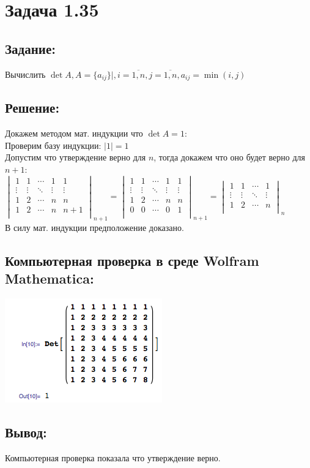 \section{Задача 1.35}
\subsection{Задание:}
Вычислить $ \det A, A = \{ a_{ij} \} |, i = \overline{1,n}, j = \overline{1,n}, a_{ij} = \min (i,j) $
\subsection{Решение:}
Докажем методом мат. индукции что $ \det A = 1 $:
\\
Проверим базу индукции: $ |1| = 1 $
\\
Допустим что утверждение верно для $ n $, тогда докажем что оно будет верно для $ n + 1 $:
\\[1em]
$
	\begin{vmatrix}
		     1 &      1 & \cdots &      1 &       1 \\
		\vdots & \vdots & \ddots & \vdots &  \vdots \\
		     1 &      2 & \cdots &      n &       n \\
		     1 &      2 & \cdots &      n &   n + 1 \\
	\end{vmatrix}_{n + 1}
	=
	\begin{vmatrix}
		     1 &      1 & \cdots &      1 &       1 \\
		\vdots & \vdots & \ddots & \vdots &  \vdots \\
		     1 &      2 & \cdots &      n &       n \\
		     0 &      0 & \cdots &      0 &       1 \\
	\end{vmatrix}_{n + 1}
	=
	\begin{vmatrix}
		     1 &      1 & \cdots &      1  \\
		\vdots & \vdots & \ddots & \vdots  \\
		     1 &      2 & \cdots &      n  \\
	\end{vmatrix}_n
$
\\[1em]
В силу мат. индукции предположение доказано.
\subsection{Компьютерная проверка в среде Wolfram Mathematica:}
\includegraphics[scale=0.6]{task/1_35/screen1.png}
\subsection{Вывод:}
Компьютерная проверка показала что утверждение верно.
